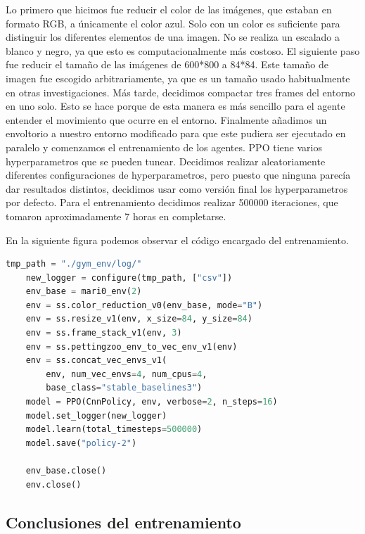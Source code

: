 Lo primero que hicimos fue reducir el color de las imágenes, que estaban en formato RGB, a únicamente el color azul. Solo con un color es suficiente para distinguir los diferentes elementos de una imagen. No se realiza un escalado a blanco y negro, ya que esto es computacionalmente más costoso. El siguiente paso fue reducir el tamaño de las imágenes de 600*800 a 84*84. Este tamaño de imagen fue escogido arbitrariamente, ya que es un tamaño usado habitualmente en otras investigaciones. Más tarde, decidimos compactar tres frames del entorno en uno solo. Esto se hace porque de esta manera es más sencillo para el agente entender el movimiento que ocurre en el entorno. Finalmente añadimos un envoltorio a nuestro entorno modificado para que este pudiera ser ejecutado en paralelo y comenzamos el entrenamiento de los agentes. PPO tiene varios hyperparametros que se pueden tunear. Decidimos realizar aleatoriamente diferentes configuraciones de hyperparametros, pero puesto que ninguna parecía dar resultados distintos, decidimos usar como versión final los hyperparametros por defecto. Para el entrenamiento decidimos realizar 500000 iteraciones, que tomaron aproximadamente 7 horas en completarse.

En la siguiente figura podemos observar el código encargado del entrenamiento.

\begin{lstlisting}[language=Python]
    tmp_path = "./gym_env/log/"
    new_logger = configure(tmp_path, ["csv"])
    env_base = mari0_env(2)
    env = ss.color_reduction_v0(env_base, mode="B")
    env = ss.resize_v1(env, x_size=84, y_size=84)
    env = ss.frame_stack_v1(env, 3)
    env = ss.pettingzoo_env_to_vec_env_v1(env)
    env = ss.concat_vec_envs_v1(
        env, num_vec_envs=4, num_cpus=4, 
        base_class="stable_baselines3")
    model = PPO(CnnPolicy, env, verbose=2, n_steps=16)
    model.set_logger(new_logger)
    model.learn(total_timesteps=500000)
    model.save("policy-2")
    
    env_base.close()
    env.close()

\end{lstlisting}

\subsection*{Conclusiones del entrenamiento}

